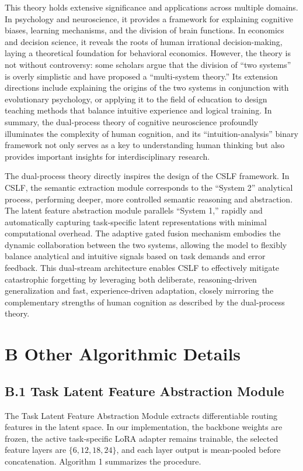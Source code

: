 \documentclass[11pt]{article}
\begin{document}
This theory holds extensive significance and applications across multiple domains. In psychology and neuroscience, it provides a framework for explaining cognitive biases, learning mechanisms, and the division of brain functions. In economics and decision science, it reveals the roots of human irrational decision-making, laying a theoretical foundation for behavioral economics. However, the theory is not without controversy: some scholars argue that the division of ``two systems'' is overly simplistic and have proposed a ``multi-system theory.'' Its extension directions include explaining the origins of the two systems in conjunction with evolutionary psychology, or applying it to the field of education to design teaching methods that balance intuitive experience and logical training. In summary, the dual-process theory of cognitive neuroscience profoundly illuminates the complexity of human cognition, and its ``intuition-analysis'' binary framework not only serves as a key to understanding human thinking but also provides important insights for interdisciplinary research.

The dual-process theory directly inspires the design of the CSLF framework. In CSLF, the semantic extraction module corresponds to the ``System 2'' analytical process, performing deeper, more controlled semantic reasoning and abstraction. The latent feature abstraction module parallels ``System 1,'' rapidly and automatically capturing task-specific latent representations with minimal computational overhead. The adaptive gated fusion mechanism embodies the dynamic collaboration between the two systems, allowing the model to flexibly balance analytical and intuitive signals based on task demands and error feedback. This dual-stream architecture enables CSLF to effectively mitigate catastrophic forgetting by leveraging both deliberate, reasoning-driven generalization and fast, experience-driven adaptation, closely mirroring the complementary strengths of human cognition as described by the dual-process theory.

\section*{B  Other Algorithmic Details}

\subsection*{B.1 Task Latent Feature Abstraction Module}

The Task Latent Feature Abstraction Module extracts differentiable routing features in the latent space. In our implementation, the backbone weights are frozen, the active task-specific LoRA adapter remains trainable, the selected feature layers are $\{6, 12, 18, 24\}$, and each layer output is mean-pooled before concatenation. Algorithm 1 summarizes the procedure.
\end{document}
